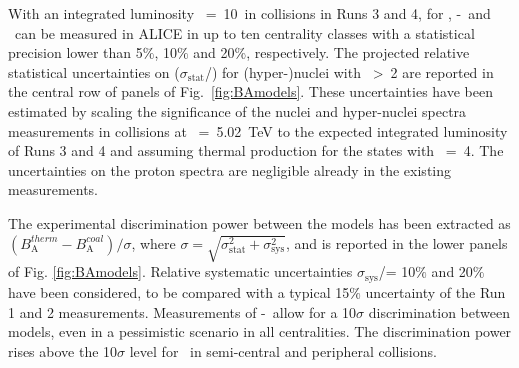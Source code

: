 With an integrated luminosity \Lint~=~10~\nbInv in \PbPb collisions in Runs 3 and 4, \BA for \hethree, \hyp~and \hefour~can be measured in ALICE in up to ten centrality classes with a statistical precision lower than 5$\%$, 10$\%$ and 20$\%$, respectively.
The projected relative statistical uncertainties on \BA ($\sigma_{\mathrm{stat}}$/\BA) for (hyper-)nuclei with \Anucl~>~2 are reported in the central row of panels of Fig.~\ref{fig:BAmodels}.
These uncertainties have been estimated by scaling the significance of the nuclei and hyper-nuclei spectra measurements in \PbPb collisions at \sqrtsNN~=~5.02~TeV \cite{ALICE-PUBLIC-2017-006, Trogolo:2017oii} to the expected integrated luminosity of Runs 3 and 4 and assuming thermal production for the states with \Anucl~=~4. The uncertainties on the proton spectra are negligible already in the existing measurements.
 
The experimental discrimination power between the models has been extracted as $(B_{\mathrm{A}}^{therm} - B_{\mathrm{A}}^{coal})/\sigma$, where $\sigma = \sqrt{\sigma_{\mathrm{stat}}^{2} + \sigma_{\mathrm{sys}}^{2}}$, and is reported in the lower panels of Fig. \ref{fig:BAmodels}.
Relative systematic uncertainties $\sigma_{\mathrm{sys}}$/\BA = 10$\%$ and 20$\%$ have been considered, to be compared with a typical 15$\%$ uncertainty of the Run 1 and 2 measurements. 
Measurements of \hyp~allow for a 10$\sigma$ discrimination between models, even in a pessimistic scenario in all centralities. The discrimination power rises above the 10$\sigma$ level for \hefour~in semi-central and peripheral collisions.  

